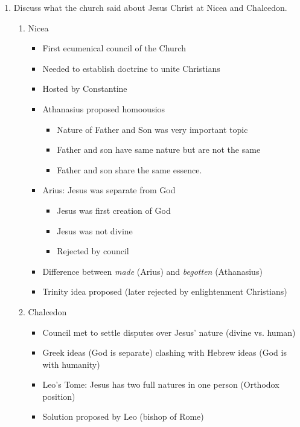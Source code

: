 \documentclass[8pt]{article}
\begin{document}
\begin{enumerate}
    \item Discuss what the church said about Jesus Christ at Nicea and Chalcedon.
    \begin{enumerate}
        \item Nicea
        \begin{itemize}
            \item First ecumenical council of the Church
            \item Needed to establish doctrine to unite Christians
            \item Hosted by Constantine
            \item Athanasius proposed homoousios
            \begin{itemize}
                \item Nature of Father and Son was very important topic
                \item Father and son have same nature but are not the same
                \item Father and son share the same essence.
            \end{itemize}
            \item Arius: Jesus was separate from God
            \begin{itemize}
                \item Jesus was first creation of God
                \item Jesus was not divine
                \item Rejected by council
            \end{itemize}
            \item Difference between \textit{made} (Arius) and \textit{begotten} (Athanasius)
            \item Trinity idea proposed (later rejected by enlightenment Christians)
        \end{itemize}
        \item Chalcedon
        \begin{itemize}
            \item Council met to settle disputes over Jesus' nature (divine vs. human)
            \item Greek ideas (God is separate) clashing with Hebrew ideas (God is with humanity)
            \item Leo's Tome: Jesus has two full natures in one person (Orthodox position)
            \item Solution proposed by Leo (bishop of Rome)
            \begin{itemize}

\end{itemize}
\end{itemize}
\end{enumerate}
\end{enumerate}
\end{document}
